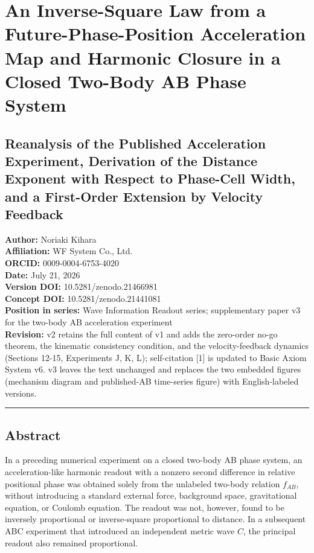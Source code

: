 \documentclass[
  a4paper,
]{article}
\author{}
\date{}
\begin{document}
\section{An Inverse-Square Law from a Future-Phase-Position Acceleration
Map and Harmonic Closure in a Closed Two-Body AB Phase
System}\label{an-inverse-square-law-from-a-future-phase-position-acceleration-map-and-harmonic-closure-in-a-closed-two-body-ab-phase-system}

\subsection{Reanalysis of the Published Acceleration Experiment,
Derivation of the Distance Exponent with Respect to Phase-Cell Width,
and a First-Order Extension by Velocity
Feedback}\label{reanalysis-of-the-published-acceleration-experiment-derivation-of-the-distance-exponent-with-respect-to-phase-cell-width-and-a-first-order-extension-by-velocity-feedback}

\textbf{Author:} Noriaki Kihara\\
\textbf{Affiliation:} WF System Co., Ltd.\\
\textbf{ORCID:} 0009-0004-6753-4020\\
\textbf{Date:} July 21, 2026\\
\textbf{Version DOI:} 10.5281/zenodo.21466981\\
\textbf{Concept DOI:} 10.5281/zenodo.21441081\\
\textbf{Position in series:} Wave Information Readout series;
supplementary paper v3 for the two-body AB acceleration experiment\\
\textbf{Revision:} v2 retains the full content of v1 and adds the
zero-order no-go theorem, the kinematic consistency condition, and the
velocity-feedback dynamics (Sections 12-15, Experiments J, K, L);
self-citation {[}1{]} is updated to Basic Axiom System v6. v3 leaves the
text unchanged and replaces the two embedded figures (mechanism diagram
and published-AB time-series figure) with English-labeled versions.

\begin{center}\rule{0.5\linewidth}{0.5pt}\end{center}

\subsection{Abstract}\label{abstract}

In a preceding numerical experiment on a closed two-body AB phase
system, an acceleration-like harmonic readout with a nonzero second
difference in relative positional phase was obtained solely from the
unlabeled two-body relation \(f_{AB}\), without introducing a standard
external force, background space, gravitational equation, or Coulomb
equation. The readout was not, however, found to be inversely
proportional or inverse-square proportional to distance. In a subsequent
ABC experiment that introduced an independent metric wave \(C\), the
principal readout also remained proportional.
\end{document}
